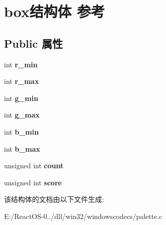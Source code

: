 \hypertarget{structbox}{}\section{box结构体 参考}
\label{structbox}
\subsection*{Public 属性}
\begin{DoxyCompactItemize}
\item 
\mbox{\label{structbox_a374a64cb3b774eb273c6c06d86ce3a24}} 
int {\bfseries r\+\_\+min}
\item 
\mbox{\label{structbox_a9e5db69462cd29d49a4bda045f51be95}} 
int {\bfseries r\+\_\+max}
\item 
\mbox{\label{structbox_ade099b3de846d8dcaac308484ed6e15d}} 
int {\bfseries g\+\_\+min}
\item 
\mbox{\label{structbox_ac15ad1b582f24d0a36e93596039b5ffe}} 
int {\bfseries g\+\_\+max}
\item 
\mbox{\label{structbox_a7d3e4758fcf627ea4cdd2254000e3c58}} 
int {\bfseries b\+\_\+min}
\item 
\mbox{\label{structbox_a384e4d18c09fe884d6b4ddfc5135b718}} 
int {\bfseries b\+\_\+max}
\item 
\mbox{\label{structbox_a557e680cae2dee35067d3e015d43bc70}} 
unsigned int {\bfseries count}
\item 
\mbox{\label{structbox_a26c11c62e4090183d4b3e9101861723b}} 
unsigned int {\bfseries score}
\end{DoxyCompactItemize}


该结构体的文档由以下文件生成\+:\begin{DoxyCompactItemize}
\item 
E\+:/\+React\+O\+S-\/0../dll/win32/windowscodecs/palette.\+c\end{DoxyCompactItemize}
